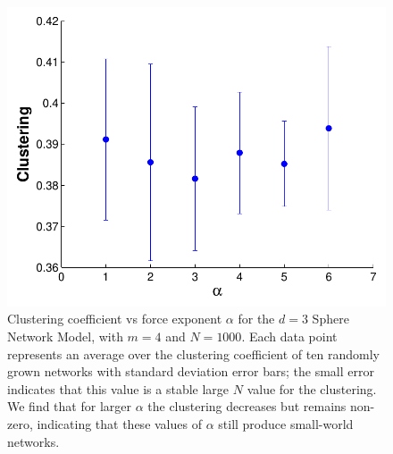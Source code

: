 \documentclass[aps,pre,manuscript,superscriptaddress,amsmath,amssymb,nofootinbib]{revtex4-1}
\begin{document}
\begin{figure}
\includegraphics[width=\linewidth]{figures/figCvsAlpha.pdf}
\caption{\label{forcelaw}Clustering coefficient vs force exponent $\alpha$ for the $d = 3$ Sphere Network Model, with $m = 4$ and $N = 1000$. Each data point represents an average over the clustering coefficient of ten randomly grown networks with standard deviation error bars; the small error indicates that this value is a stable large $N$ value for the clustering. We find that for larger $\alpha$ the clustering decreases but remains non-zero, indicating that these values of $\alpha$ still produce small-world networks.}
\end{figure}

\nocite{newmanreview}

\end{document}
